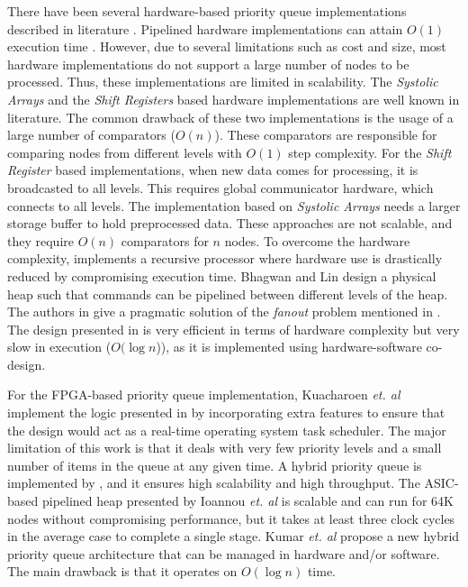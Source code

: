 There have been several hardware-based priority queue implementations described in literature \cite{hw1,hw2,hw3,hw5,hw6,hw7,hw8,hw9}.
Pipelined hardware implementations can attain $O(1)$ execution time \cite{hw5,hw6}.
However, due to several limitations such as cost and size, most hardware implementations do not support a large number of nodes to be processed.
Thus, these implementations are limited in scalability.
The {\it Systolic Arrays} and the {\it Shift Registers} \cite{hw8,hw9} based hardware implementations are well known in literature.
The common drawback of these two implementations is the usage of a large number of comparators ($O(n)$).
These comparators are responsible for comparing nodes from different levels with $O(1)$ step complexity.
For the {\it Shift Register} \cite{hw9} based implementations, when new data comes for processing, it is broadcasted to all levels.
This requires global communicator hardware, which connects to all levels.
The implementation based on {\it Systolic Arrays} \cite{hw8} needs a larger storage buffer to hold preprocessed data.
These approaches are not scalable, and they require $O(n)$ comparators for $n$ nodes.
To overcome the hardware complexity, \cite{hw10} implements a recursive processor where hardware use is drastically reduced by compromising execution time.
Bhagwan and Lin \cite{hw2} design a physical heap such that commands can be pipelined between different levels of the heap.
The authors in \cite{hw1} give a pragmatic solution of the {\it fanout} problem mentioned in \cite{hw3}.
The design presented in \cite{hw11} is very efficient in terms of hardware complexity but very slow in execution ($O(\log n$)), as it is implemented using hardware-software co-design.

For the FPGA-based priority queue implementation, Kuacharoen {\it et. al} \cite{fpga3} implement the logic presented in \cite{hw3} by incorporating extra features to ensure that the design would act as a real-time operating system task scheduler.
The major limitation of this work is that it deals with very few priority levels and a small number of items in the queue at any given time.
A hybrid priority queue is implemented by \cite{fpga2}, and it ensures high scalability and high throughput.
The ASIC-based pipelined heap presented by Ioannou {\it et. al} \cite{fpga1} is scalable and can run for 64K nodes without compromising performance, but it takes at least three clock cycles in the average case to complete a single stage.
Kumar {\it et. al} \cite{hwsw1} propose a new hybrid priority queue architecture that can be managed in hardware and/or software.
The main drawback is that it operates on $O(\log n)$ time.

